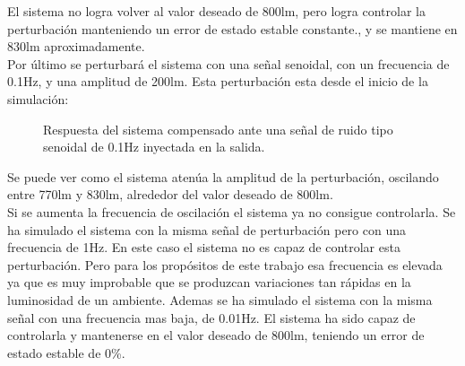 \documentclass[a4paper,11pt]{article}
\begin{document}
El sistema no logra volver al valor deseado de 800lm, pero logra controlar la perturbación manteniendo un error de estado estable constante., y se mantiene en 830lm aproximadamente.\\
Por último se perturbará el sistema con una señal senoidal, con un frecuencia de 0.1Hz, y una amplitud de 200lm. Esta perturbación esta desde el inicio de la simulación:\\

	  \begin{figure}[H] %
	\caption{Respuesta del sistema compensado ante una señal de ruido tipo senoidal de 0.1Hz inyectada en la salida.}
	\label{fig:ruido3}
	\end{figure}
	
Se puede ver como el sistema atenúa la amplitud de la perturbación, oscilando entre 770lm y 830lm, alrededor del valor deseado de 800lm.\\
Si se aumenta la frecuencia de oscilación el sistema ya no consigue controlarla. Se ha simulado el sistema con la misma señal de perturbación pero con una frecuencia de 1Hz. En este caso el sistema no es capaz de controlar esta perturbación. Pero para los propósitos de este trabajo esa frecuencia es elevada ya que es muy improbable que se produzcan variaciones tan rápidas en la luminosidad de un ambiente.
Ademas se ha simulado el sistema con la misma señal con una frecuencia mas baja, de 0.01Hz. El sistema ha sido capaz de controlarla y mantenerse en el valor deseado de 800lm, teniendo un error de estado estable de 0\%.\\
\end{document}

